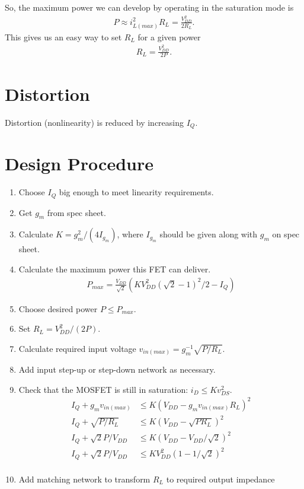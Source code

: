 \documentclass[letterpaper,10pt]{report}
\begin{document}
So, the maximum power we can develop by operating in the saturation mode is
\begin{align}
 P \approx i_{L(max)}^2R_L = \frac{V_{DD}^2}{2R_L}.
\end{align}
This gives us an easy way to set $R_L$ for a given power
\begin{align}
 R_L = \frac{V_{DD}^2}{2P}.
\end{align}


\section{Distortion}

Distortion (nonlinearity) is reduced by increasing $I_Q$.

\section{Design Procedure}

\begin{enumerate}
 \item Choose $I_Q$ big enough to meet linearity requirements.
 \item Get $g_m$ from spec sheet.
 \item Calculate $K = g_m^2/(4I_{g_m})$, where $I_{g_m}$ should be given along with
       $g_m$ on spec sheet.
 \item Calculate the maximum power this FET can deliver.
  \begin{align}
   P_{max} = \frac{V_{DD}}{\sqrt{2}}(KV_{DD}^2(\sqrt{2}-1)^2/2-I_Q)
  \end{align}
 \item Choose desired power $P \leq P_{max}$.
 \item Set $R_L=V_{DD}^2/(2P)$.

 \item Calculate required input voltage $v_{in(max)} = g_m^{-1}\sqrt{P/R_L}$.
 \item Add input step-up or step-down network as necessary.
 \item Check that the MOSFET is still in saturation: $i_D \leq K v_{DS}^2$.
  \begin{align}
   I_Q + g_m v_{in(max)} &\leq K (V_{DD}-g_m v_{in(max)}R_L)^2 \nonumber \\
   I_Q + \sqrt{P/R_L} &\leq K(V_{DD}-\sqrt{P R_L})^2 \nonumber \\
   I_Q + \sqrt{2} P/V_{DD} &\leq K(V_{DD}-V_{DD}/\sqrt{2})^2 \nonumber \\
   I_Q + \sqrt{2} P/V_{DD} &\leq KV_{DD}^2(1-1/\sqrt{2})^2 \nonumber \\
  \end{align}
 \item Add matching network to transform $R_L$ to required output impedance
\end{enumerate}
\end{document}
